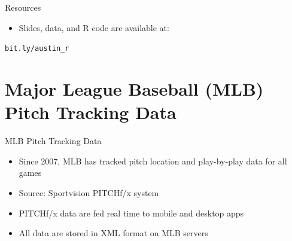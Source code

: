 


\maketitle

\begin{frame}{Resources}

\begin{itemize}
\tightlist
\item
  Slides, data, and R code are available at:
\end{itemize}

\begin{center}
\color{brightpink}\Large{\texttt{bit.ly/austin\_r}}
\end{center}

\end{frame}

\section{\texorpdfstring{Major League Baseball (MLB)
\protect \newline Pitch Tracking
Data}{Major League Baseball (MLB) Pitch Tracking Data}}\label{major-league-baseball-mlb-pitch-tracking-data}

\begin{frame}{MLB Pitch Tracking Data}

\begin{itemize}
\tightlist
\item
  Since 2007, MLB has tracked pitch location and play-by-play data for
  all games
\item
  Source: Sportvision PITCHf/x system
\item
  PITCHf/x data are fed real time to mobile and desktop apps
\item
  All data are stored in XML format on MLB servers
\end{itemize}

\end{frame}

